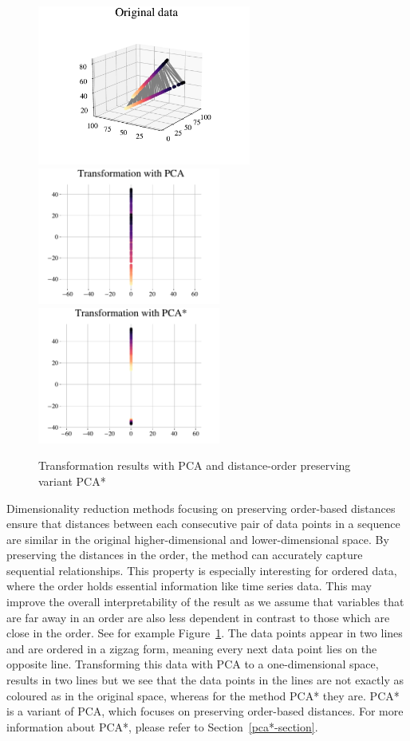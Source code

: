 \documentclass[pdftex,12pt,a4paper]{report}
\begin{document}
\begin{figure}[htb!]
    \begin{center}
        \includegraphics[width=7cm]{images/demo-structure-preservation/zigzag.pdf}
        \includegraphics[width=6cm]{images/demo-structure-preservation/zigzag_pca.pdf}\hfill
        \includegraphics[width=6cm]{images/demo-structure-preservation/zigzag_vector.pdf}
        \caption{Transformation results with PCA and distance-order preserving variant PCA*}
        \label{demo:order-preservation-our}
    \end{center}
\end{figure}
Dimensionality reduction methods focusing on preserving order-based distances ensure that distances between each consecutive pair of data points in a sequence are similar in the original higher-dimensional and lower-dimensional space.
By preserving the distances in the order, the method can accurately capture sequential relationships.
This property is especially interesting for ordered data, where the order holds essential information like time series data.
This may improve the overall interpretability of the result as we assume that variables that are far away in an order are also less dependent in contrast to those which are close in the order.
See for example Figure~\ref{demo:order-preservation-our}.
The data points appear in two lines and are ordered in a zigzag form, meaning every next data point lies on the opposite line.
Transforming this data with PCA to a one-dimensional space, results in two lines but we see that the data points in the lines are not exactly as coloured as in the original space, whereas for the method PCA* they are.
PCA* is a variant of PCA, which focuses on preserving order-based distances.
For more information about PCA*, please refer to Section~\ref{pca*-section}.
\end{document}
